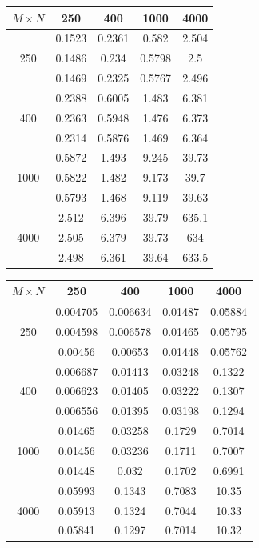 \begin{minipage}[h]{0.44\textwidth}
\centering
\begin{tabular}{c|c|c|c|c|}
$M \times N$ & 250 & 400 & 1000 & 4000 \\
\hline
 & 0.1523 & 0.2361 & 0.582 & 2.504 \\
250 & 0.1486 & 0.234 & 0.5798 & 2.5 \\
 & 0.1469 & 0.2325 & 0.5767 & 2.496 \\
\hline
 & 0.2388 & 0.6005 & 1.483 & 6.381 \\
400 & 0.2363 & 0.5948 & 1.476 & 6.373 \\
 & 0.2314 & 0.5876 & 1.469 & 6.364 \\
\hline
 & 0.5872 & 1.493 & 9.245 & 39.73 \\
1000 & 0.5822 & 1.482 & 9.173 & 39.7 \\
 & 0.5793 & 1.468 & 9.119 & 39.63 \\
\hline
 & 2.512 & 6.396 & 39.79 & 635.1 \\
4000 & 2.505 & 6.379 & 39.73 & 634 \\
 & 2.498 & 6.361 & 39.64 & 633.5 \\
\hline
\end{tabular}
\end{minipage}
\hfill
\begin{minipage}[h]{0.50\textwidth}
\centering
\begin{tabular}{c|c|c|c|c|}
$M \times N$ & 250 & 400 & 1000 & 4000 \\
\hline
 & 0.004705 & 0.006634 & 0.01487 & 0.05884 \\
250 & 0.004598 & 0.006578 & 0.01465 & 0.05795 \\
 & 0.00456 & 0.00653 & 0.01448 & 0.05762 \\
\hline
 & 0.006687 & 0.01413 & 0.03248 & 0.1322 \\
400 & 0.006623 & 0.01405 & 0.03222 & 0.1307 \\
 & 0.006556 & 0.01395 & 0.03198 & 0.1294 \\
\hline
 & 0.01465 & 0.03258 & 0.1729 & 0.7014 \\
1000 & 0.01456 & 0.03236 & 0.1711 & 0.7007 \\
 & 0.01448 & 0.032 & 0.1702 & 0.6991 \\
\hline
 & 0.05993 & 0.1343 & 0.7083 & 10.35 \\
4000 & 0.05913 & 0.1324 & 0.7044 & 10.33 \\
 & 0.05841 & 0.1297 & 0.7014 & 10.32 \\
\hline
\end{tabular}
\end{minipage}
\vspace{1em}

